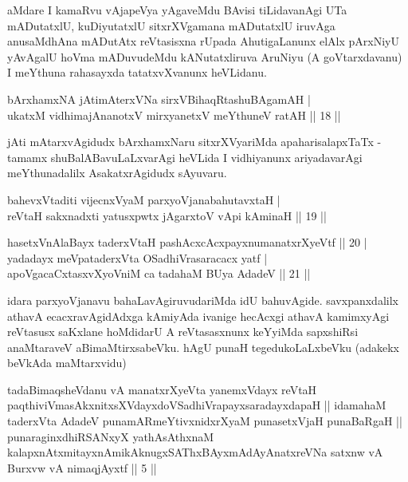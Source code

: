 \begin{artha}
aMdare I kamaRvu vAjapeVya yAgaveMdu BAvisi tiLidavanAgi UTa 
mADutatxlU, kuDiyutatxlU sitxrXVgamana mADutatxlU iruvAga anusaMdhAna 
mADutAtx reVtasisxna rUpada AhutigaLanunx elAlx pArxNiyU yAvAgalU 
hoVma mADuvudeMdu kANutatxliruva AruNiyu (A goVtarxdavanu) I meYthuna 
rahasayxda tatatxvXvanunx heVLidanu.
\end{artha}


\begin{shl}
bArxhamxNA jAtimAterxVNa sirxVBihaqRtashuBAgamAH | \\
ukatxM vidhimajAnanotxV mirxyanetxV meYthuneV ratAH \hfill|| 18 || 
\end{shl}

\begin{artha}
jAti mAtarxvAgidudx bArxhamxNaru sitxrXVyariMda apaharisalapxTaTx - 
tamamx shuBalABavuLaLxvarAgi heVLida I vidhiyanunx ariyadavarAgi 
meYthunadalilx AsakatxrAgidudx sAyuvaru.
\end{artha}

\begin{shl}
bahevxVtaditi vijecnxVyaM parxyoVjanabahutavxtaH | \\
reVtaH sakxnadxti yatusxpwtx jAgarxtoV vA\s pi kAminaH \hfill|| 19 || 
\end{shl}

\begin{shl}
hasetxVnA\s \s laBayx taderxVtaH pashAcxcAcxpayxnumanatxrXyeVtf \hfill|| 20 | \\
yadadayx meV\s pataderxVta OSadhiVrasaracacx yatf | \\
apoV\s gacaCxtasxvXyoVniM ca tadahaM BUya AdadeV \hfill|| 21 || 
\end{shl}

\begin{artha}
idara parxyoVjanavu bahaLavAgiruvudariMda idU bahuvAgide. 
savxpanxdalilx athavA ecacxravAgidAdxga kAmiyAda ivanige hecAcxgi 
athavA kamimxyAgi reVtasusx saKxlane hoMdidarU A reVtasasxnunx 
keYyiMda sapxshiRsi anaMtaraveV aBimaMtirxsabeVku. hAgU punaH 
tegedukoLaLxbeVku (adakekx beVkAda maMtarxvidu)
\end{artha}

\begin{shl}
tadaBimaqsheVdanu vA manatxrXyeVta yanemxV\s dayx reVtaH paqthiviVmasAkxnitxsXVdayxdoVSadhiVrapayxsaradayxdapaH || idamahaM taderxVta AdadeV punamARmeYtivxnidxrXyaM punasetxVjaH punaBaRgaH || punaraginxdhiRSANxyX yathAsAthxnaM kalapxnAtxmitayxnAmikAknugxSAThxBAyxmAdAyAnatxreVNa satxnw vA Burxvw vA nimaqjAyxtf || 5 ||
\end{shl}

